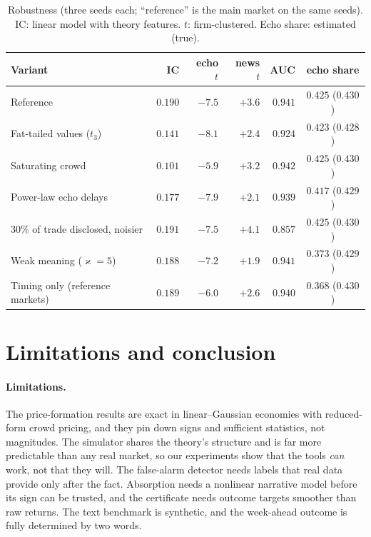\documentclass{article}
\theoremstyle{plain}
\theoremstyle{definition}
\theoremstyle{remark}
\begin{document}
\begin{table}[t]
\caption{Robustness (three seeds each; ``reference'' is the main market on the same seeds). IC: linear model with theory features. $t$: firm-clustered. Echo share: estimated (true).}
\label{tab:mainRobust}
\centering
\small
\setlength{\tabcolsep}{5pt}
\begin{tabular}{@{}lrrrrc@{}}
\toprule
Variant & IC & echo $t$ & news $t$ & AUC & echo share \\
\midrule
Reference & $0.190$ & $-7.5$ & $+3.6$ & $0.941$ & $0.425$ ($0.430$) \\
Fat-tailed values ($t_3$) & $0.141$ & $-8.1$ & $+2.4$ & $0.924$ & $0.423$ ($0.428$) \\
Saturating crowd & $0.101$ & $-5.9$ & $+3.2$ & $0.942$ & $0.425$ ($0.430$) \\
Power-law echo delays & $0.177$ & $-7.9$ & $+2.1$ & $0.939$ & $0.417$ ($0.429$) \\
30\% of trade disclosed, noisier & $0.191$ & $-7.5$ & $+4.1$ & $0.857$ & $0.425$ ($0.430$) \\
Weak meaning ($\varkappa=5$) & $0.188$ & $-7.2$ & $+1.9$ & $0.941$ & $0.373$ ($0.429$) \\
Timing only (reference markets) & $0.189$ & $-6.0$ & $+2.6$ & $0.940$ & $0.368$ ($0.430$) \\
\bottomrule
\end{tabular}
\end{table}

\section{Limitations and conclusion}\label{sec:discussion}

\paragraph{Limitations.} The price-formation results are exact in linear--Gaussian economies with reduced-form crowd pricing, and they pin down signs and sufficient statistics, not magnitudes. The simulator shares the theory's structure and is far more predictable than any real market, so our experiments show that the tools \emph{can} work, not that they will. The false-alarm detector needs labels that real data provide only after the fact. Absorption needs a nonlinear narrative model before its sign can be trusted, and the certificate needs outcome targets smoother than raw returns. The text benchmark is synthetic, and the week-ahead outcome is fully determined by two words.
\end{document}
